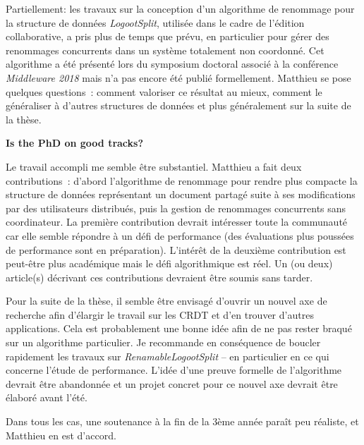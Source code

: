 \documentclass[12pt]{article}
\newcommand{\commentaire}[1]{}
\begin{document}
Partiellement: les travaux sur la conception d'un algorithme de renommage pour la
structure de données \emph{LogootSplit}, utilisée dans le cadre de l'édition
collaborative, a pris plus de temps que prévu, en particulier pour gérer des
renommages concurrents dans un système totalement non coordonné. Cet algorithme
a été présenté lors du symposium doctoral associé à la conférence
\emph{Middleware 2018} mais n'a pas encore été publié formellement. Matthieu se
pose quelques questions~: comment valoriser ce résultat au mieux, comment le
généraliser à d'autres structures de données et plus généralement sur la suite
de la thèse.

\medskip
\noindent\textbf{Is the PhD on good tracks?}
\commentaire{%
  E.g: Is the student comfortable with his/her thesis topic? Did
  she/he embraced the subject? Do you have any comments or advice
  concerning publications? Does the student have opportunities to
  present her/his work? Do you have noteworthy concerns about the
  progression of the thesis?\\}

Le travail accompli me semble être substantiel. Matthieu a fait deux
contributions~: d'abord l'algorithme de renommage pour rendre plus compacte la
structure de données représentant un document partagé suite à ses modifications
par des utilisateurs distribués, puis la gestion de renommages concurrents sans
coordinateur. La première contribution devrait intéresser toute la communauté
car elle semble répondre à un défi de performance (des évaluations plus poussées
de performance sont en préparation). L'intérêt de la deuxième contribution est
peut-être plus académique mais le défi algorithmique est réel. Un (ou deux)
article(s) décrivant ces contributions devraient être soumis sans tarder.

Pour la suite de la thèse, il semble être envisagé d'ouvrir un nouvel axe de
recherche afin d'élargir le travail sur les CRDT et d'en trouver d'autres
applications. Cela est probablement une bonne idée afin de ne pas rester
braqué sur un algorithme particulier. Je recommande en conséquence de boucler
rapidement les travaux sur \emph{RenamableLogootSplit} -- en particulier en ce
qui concerne l'étude de performance. L'idée d'une preuve formelle
de l'algorithme devrait être abandonnée et un projet concret pour ce nouvel axe
devrait être élaboré avant l'été.

Dans tous les cas, une soutenance à la fin de la 3ème année paraît peu réaliste,
et Matthieu en est d'accord.
\end{document}
